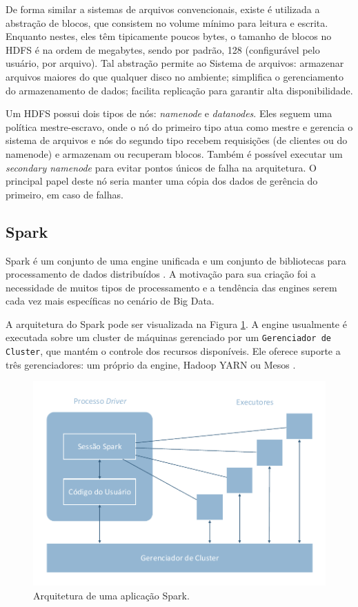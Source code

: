 De forma similar a sistemas de arquivos convencionais, existe é utilizada a 
abstração de blocos, que consistem no volume mínimo para leitura e escrita. 
Enquanto nestes, eles têm tipicamente poucos bytes, o tamanho de blocos no HDFS 
é na ordem de megabytes, sendo por padrão, 128 (configurável pelo usuário, por 
arquivo). Tal abstração permite ao Sistema de arquivos: armazenar arquivos 
maiores do que qualquer disco no ambiente; simplifica o gerenciamento do 
armazenamento de dados; facilita replicação para garantir alta disponibilidade.

Um HDFS possui dois tipos de nós: \emph{namenode} e \emph{datanodes}. Eles 
seguem uma política mestre-escravo, onde o nó do primeiro tipo atua como mestre 
e gerencia o sistema de arquivos e nós do segundo tipo recebem requisições (de 
clientes ou do namenode) e armazenam ou recuperam blocos. Também é possível 
executar um \textit{secondary namenode} para evitar pontos únicos de falha na 
arquitetura. O principal papel deste nó seria manter uma cópia dos dados de 
gerência do primeiro, em caso de falhas.

\subsection{Spark} \label{ref:spark}

Spark é um conjunto de uma engine unificada e um conjunto de bibliotecas para 
processamento de dados distribuídos \cite{ref:sparkbook}. A motivação para sua 
criação foi a necessidade de muitos tipos de processamento e a tendência das 
engines serem cada vez mais específicas no cenário de Big Data.

A arquitetura do Spark pode ser visualizada na Figura \ref{fig:spark-arch}. A 
engine usualmente é executada sobre um cluster de máquinas gerenciado por um 
\texttt{Gerenciador de Cluster}, que mantém o controle dos recursos 
disponíveis. Ele oferece suporte a três gerenciadores: um próprio da engine, 
Hadoop YARN ou Mesos \cite{ref:mesos}.

\begin{figure}[ht]
 \centerline{\includegraphics[width=1\textwidth]{./img/spark-arch.pdf}}
 \caption{Arquitetura de uma aplicação Spark.}
 \label{fig:spark-arch}
\end{figure}

